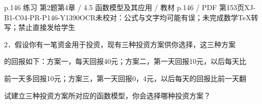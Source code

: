 \begin{bankitem}{p.146 练习 第2题}{第4章 / 4.5 函数模型及其应用 / 教材 p.146 / PDF 第153页}{XJ-B1-C04-PR-P146-Y1390}{OCR未校对：公式与文字均可能有误；未完成数学TeX转写；禁止直接发给学生}
\begin{ocrdraft}
\par
2．假设你有一笔资金用于投资，现有三种投资方案供你选择，这三种方案
\par
的回报如下：方案一，每天回报40元；方案二，第一天回报10元，以后每天比
\par
前一天多回报10元；方案三，第一天回报0，4元，以后每天的回报比前一天翻
\par
试建立三种投资方案所对应的函数模型，你会选择哪种投资方案？
\end{ocrdraft}
\end{bankitem}
